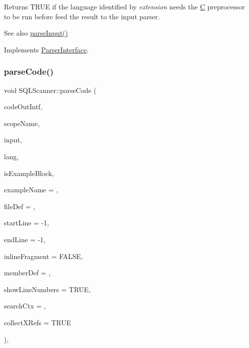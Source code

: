Returns T\+R\+UE if the language identified by {\itshape extension} needs the \mbox{\hyperlink{class_c}{C}} preprocessor to be run before feed the result to the input parser. \begin{DoxySeeAlso}{See also}
\mbox{\hyperlink{class_s_q_l_scanner_ace5de45254ddb10a6282bf626aea6994}{parse\+Input()}} 
\end{DoxySeeAlso}


Implements \mbox{\hyperlink{class_parser_interface_a36c669b17b64a6e3847f27d70a5398d2}{Parser\+Interface}}.

\mbox{\label{class_s_q_l_scanner_addaa1e6904f2cbd0e490580ed40fd89d}} 
\subsubsection{\texorpdfstring{parseCode()}{parseCode()}}
{\footnotesize\ttfamily void S\+Q\+L\+Scanner\+::parse\+Code (\begin{DoxyParamCaption}\item[{\mbox{\hyperlink{class_code_output_interface}{Code\+Output\+Interface}} \&}]{code\+Out\+Intf,  }\item[{const char $\ast$}]{scope\+Name,  }\item[{const \mbox{\hyperlink{class_q_c_string}{Q\+C\+String}} \&}]{input,  }\item[{\mbox{\hyperlink{types_8h_a9974623ce72fc23df5d64426b9178bf2}{Src\+Lang\+Ext}}}]{lang,  }\item[{bool}]{is\+Example\+Block,  }\item[{const char $\ast$}]{example\+Name = {},  }\item[{\mbox{\hyperlink{class_file_def}{File\+Def}} $\ast$}]{file\+Def = {},  }\item[{int}]{start\+Line = {\ttfamily -\/1},  }\item[{int}]{end\+Line = {\ttfamily -\/1},  }\item[{bool}]{inline\+Fragment = {\ttfamily FALSE},  }\item[{\mbox{\hyperlink{class_member_def}{Member\+Def}} $\ast$}]{member\+Def = {},  }\item[{bool}]{show\+Line\+Numbers = {\ttfamily TRUE},  }\item[{\mbox{\hyperlink{class_definition}{Definition}} $\ast$}]{search\+Ctx = {},  }\item[{bool}]{collect\+X\+Refs = {\ttfamily TRUE} }\end{DoxyParamCaption})\hspace{0.3cm}{\ttfamily [inline]}, {\ttfamily [virtual]}}

